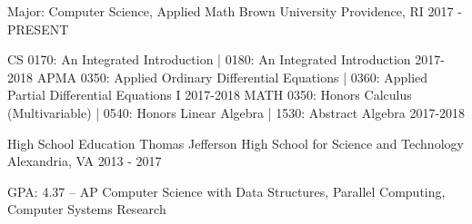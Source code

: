 \begin{cventries}
  \cventry
    {Major: Computer Science, Applied Math}
    {Brown University}
    {Providence, RI}
    {2017 - PRESENT}
    {
        \vspace{-2em}
        \begin{cvhonors}
			\cvhonor
			{CS}
			{0170: An Integrated Introduction | 0180: An Integrated Introduction}
			{}
			{2017-2018}
			\cvhonor
			{APMA}
			{0350: Applied Ordinary Differential Equations | 0360: Applied Partial Differential Equations I}
			{}
			{2017-2018}
			\cvhonor
			{MATH}
			{0350: Honors Calculus (Multivariable) | 0540: Honors Linear Algebra | 1530: Abstract Algebra}
			{}
			{2017-2018}
        \end{cvhonors}
		\vspace{-1.25em}
    }
\end{cventries}

\begin{cventries}
  \cventry
    {High School Education}
    {Thomas Jefferson High School for Science and Technology}
    {Alexandria, VA}
    {2013 - 2017}
    {
      \begin{cvitems}
		\item {GPA: 4.37 -- AP Computer Science with Data Structures, Parallel Computing, Computer Systems Research}
      \end{cvitems}
    }
	\vspace{-1.0em}
\end{cventries}
